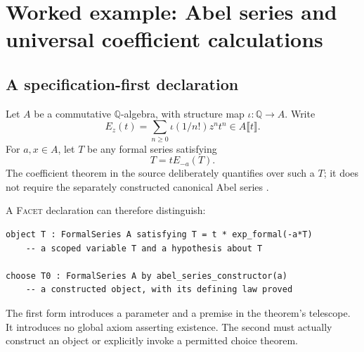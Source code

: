 \documentclass[11pt,letterpaper]{article}
\newcommand{\Facet}{\textsc{Facet}}
\newcommand{\Q}{\mathbb Q}
\numberwithin{equation}{section}
\begin{document}
\section{Worked example: Abel series and universal coefficient calculations}\label{sec:abel}
\subsection{A specification-first declaration}
Let $A$ be a commutative $\Q$-algebra, with structure map $\iota:\Q\to A$.
Write
\[
 E_z(t)=\sum_{n\ge0}\iota(1/n!)z^nt^n\in A\llbracket t\rrbracket.
\]
For $a,x\in A$, let $T$ be any formal series satisfying
\begin{equation}
 T=tE_{-a}(T).                                        \label{eq:abeldef}
\end{equation}
The coefficient theorem in the source deliberately quantifies over such a $T$;
it does not require the separately constructed canonical Abel series
\cite{p-abel}.

A \Facet{} declaration can therefore distinguish:
\par\noindent\begin{minipage}{\linewidth}
\begin{lstlisting}
object T : FormalSeries A satisfying T = t * exp_formal(-a*T)
    -- a scoped variable T and a hypothesis about T

choose T0 : FormalSeries A by abel_series_constructor(a)
    -- a constructed object, with its defining law proved
\end{lstlisting}
\end{minipage}\par

The first form introduces a parameter and a premise in the theorem's telescope.
It introduces no global axiom asserting existence. The second must actually
construct an object or explicitly invoke a permitted choice theorem.
\end{document}

